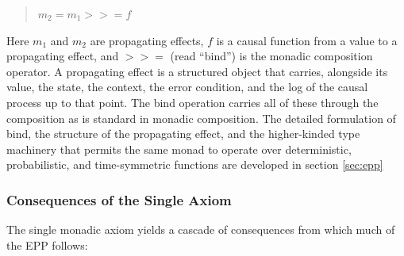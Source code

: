 \begin{quotation}
\textbf{$m_{2} = m_{1} \mathbin{>\!\!>\!\!=} f$}
\end{quotation}


\noindent Here $m_1$ and $m_2$ are propagating effects, $f$ is a causal
function from a value to a propagating effect, and $\mathbin{>\!\!>\!\!=}$
(read ``bind'') is the monadic composition operator. A propagating effect
is a structured object that carries, alongside its value, the state, the
context, the error condition, and the log of the causal process up
to that point. The bind operation carries all of these through the
composition as is standard in monadic composition. The detailed formulation of bind, the structure of the propagating effect, 
and the higher-kinded type machinery that permits the same monad to operate over
deterministic, probabilistic, and time-symmetric functions
are developed in section \ref{sec:epp} 

\subsubsection{Consequences of the Single Axiom}

The single monadic axiom yields a cascade of consequences from which much of the
EPP follows:

